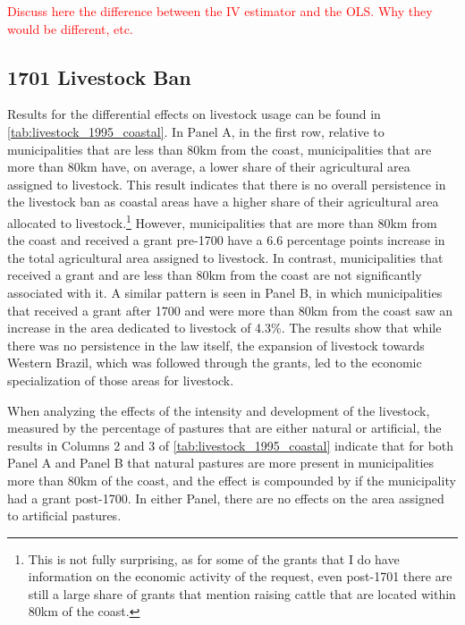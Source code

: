 \documentclass[11pt]{article}
\newcommand{\red}[1]{\textcolor{red}{#1}}
\begin{document}
\red{Discuss here the difference between the IV estimator and the OLS. Why they would be different, etc.}

\subsection{1701 Livestock Ban}

Results for the differential effects on livestock usage can be found in \autoref{tab:livestock_1995_coastal}. 
In Panel A, in the first row, relative to municipalities that are less than 80km from the coast, municipalities that are more than 80km have, on average, a lower share of their agricultural area assigned to livestock.
This result indicates that there is no overall persistence in the livestock ban as coastal areas have a higher share of their agricultural area allocated to livestock.\footnote{This is not fully surprising, as for some of the grants that I do have information on the economic activity of the request, even post-1701 there are still a large share of grants that mention raising cattle that are located within 80km of the coast.}
However, municipalities that are more than 80km from the coast and received a grant pre-1700 have a 6.6 percentage points increase in the total agricultural area assigned to livestock.
In contrast, municipalities that received a grant and are less than 80km from the coast are not significantly associated with it.
A similar pattern is seen in Panel B, in which municipalities that received a grant after 1700 and were more than 80km from the coast saw an increase in the area dedicated to livestock of 4.3\%. 
The results show that while there was no persistence in the law itself, the expansion of livestock towards Western Brazil, which was followed through the grants, led to the economic specialization of those areas for livestock.

When analyzing the effects of the intensity and development of the livestock, measured by the percentage of pastures that are either natural or artificial, the results in Columns 2 and 3 of \autoref{tab:livestock_1995_coastal} indicate that for both Panel A and Panel B that natural pastures are more present in municipalities more than 80km of the coast, and the effect is compounded by if the municipality had a grant post-1700.
In either Panel, there are no effects on the area assigned to artificial pastures.
\end{document}
